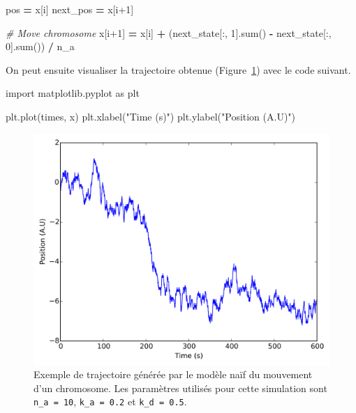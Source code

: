 \documentclass[12pt,a4paper,twoside,openright]{book}
\newenvironment{Shaded}{\begin{snugshade}}{\end{snugshade}}
\newcommand{\DecValTok}[1]{\textcolor[rgb]{0.00,0.00,0.81}{{#1}}}
\newcommand{\StringTok}[1]{\textcolor[rgb]{0.31,0.60,0.02}{{#1}}}
\newcommand{\ImportTok}[1]{{#1}}
\newcommand{\CommentTok}[1]{\textcolor[rgb]{0.56,0.35,0.01}{\textit{{#1}}}}
\newcommand{\OperatorTok}[1]{\textcolor[rgb]{0.81,0.36,0.00}{\textbf{{#1}}}}
\newcommand{\BuiltInTok}[1]{{#1}}
\newcommand{\NormalTok}[1]{{#1}}
\begin{document}
\begin{Shaded}
\begin{Highlighting}[]
    \NormalTok{pos }\OperatorTok{=} \NormalTok{x[i]}
    \NormalTok{next_pos }\OperatorTok{=} \NormalTok{x[i}\DecValTok{+1}\NormalTok{]}

    \CommentTok{# Move chromosome}
    \NormalTok{x[i}\DecValTok{+1}\NormalTok{] }\OperatorTok{=} \NormalTok{x[i] }\OperatorTok{+} \NormalTok{(next_state[:, }\DecValTok{1}\NormalTok{].}\BuiltInTok{sum}\NormalTok{() }\OperatorTok{-} \NormalTok{next_state[:, }\DecValTok{0}\NormalTok{].}\BuiltInTok{sum}\NormalTok{()) }\OperatorTok{/} \NormalTok{n_a}
\end{Highlighting}
\end{Shaded}

On peut ensuite visualiser la trajectoire obtenue
(Figure~\ref{fig:simu-oscill-trajectory}) avec le code suivant.

\begin{Shaded}
\begin{Highlighting}[]
\ImportTok{import} \NormalTok{matplotlib.pyplot }\ImportTok{as} \NormalTok{plt}

\NormalTok{plt.plot(times, x)}
\NormalTok{plt.xlabel(}\StringTok{"Time (s)"}\NormalTok{)}
\NormalTok{plt.ylabel(}\StringTok{"Position (A.U)"}\NormalTok{)}
\end{Highlighting}
\end{Shaded}

\begin{figure}[htbp]
\centering
\includegraphics{figures/annexes/simu_oscill_trajectory.png}
\caption{\label{fig:simu-oscill-trajectory}Exemple de trajectoire
générée par le modèle naïf du mouvement d'un chromosome. Les paramètres
utilisés pour cette simulation sont \texttt{n\_a\ =\ 10},
\texttt{k\_a\ =\ 0.2} et \texttt{k\_d\ =\ 0.5}.}
\end{figure}
\end{document}
